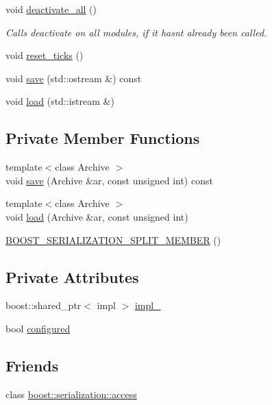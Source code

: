 \begin{DoxyCompactItemize}
void \hyperlink{structecto_1_1plasm_a6c10f2812f731c3787e5e22bdd80e9bc}{deactivate\+\_\+all} ()
\begin{DoxyCompactList}\small\item\em Calls deactivate on all modules, if it hasn\textquotesingle{}t already been called. \end{DoxyCompactList}\item 
void \hyperlink{structecto_1_1plasm_a992f656fa931efc20d2cf1a97c963cec}{reset\+\_\+ticks} ()
\item 
void \hyperlink{structecto_1_1plasm_ab0fd6bec2e5d8943363fe5aa36c1d676}{save} (std\+::ostream \&) const 
\item 
void \hyperlink{structecto_1_1plasm_a854400c2f46f995731e058c72a547185}{load} (std\+::istream \&)
\end{DoxyCompactItemize}
\subsection*{Private Member Functions}
\begin{DoxyCompactItemize}
\item 
{\footnotesize template$<$class Archive $>$ }\\void \hyperlink{structecto_1_1plasm_a420eb464746042e8247a69828e6782af}{save} (Archive \&ar, const unsigned int) const 
\item 
{\footnotesize template$<$class Archive $>$ }\\void \hyperlink{structecto_1_1plasm_ae6540bca37d0980ec24b0b75061e124e}{load} (Archive \&ar, const unsigned int)
\item 
\hyperlink{structecto_1_1plasm_ac443cf0a58324a8003e1c9fd3b49b428}{B\+O\+O\+S\+T\+\_\+\+S\+E\+R\+I\+A\+L\+I\+Z\+A\+T\+I\+O\+N\+\_\+\+S\+P\+L\+I\+T\+\_\+\+M\+E\+M\+B\+ER} ()
\end{DoxyCompactItemize}
\subsection*{Private Attributes}
\begin{DoxyCompactItemize}
\item 
boost\+::shared\+\_\+ptr$<$ impl $>$ \hyperlink{structecto_1_1plasm_a4cfd41e9dc82039a75970755565b2513}{impl\+\_\+}
\item 
bool \hyperlink{structecto_1_1plasm_a8d074da8290587fab0ed04d5cfe3f6b1}{configured}
\end{DoxyCompactItemize}
\subsection*{Friends}
\begin{DoxyCompactItemize}
\item 
class \hyperlink{structecto_1_1plasm_ac98d07dd8f7b70e16ccb9a01abf56b9c}{boost\+::serialization\+::access}
\end{DoxyCompactItemize}


